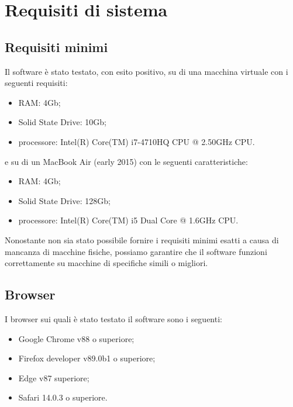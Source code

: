 \chapter{Requisiti di sistema}\label{RequisitiDiSistema}
\section{Requisiti minimi}\label{RequisitiDiSistemaRequisitiMinimi}
Il software è stato testato, con esito positivo, su di una macchina virtuale con i seguenti requisiti:
\begin{itemize}
  \item RAM: 4Gb;
  \item Solid State Drive: 10Gb;
  \item processore: Intel(R) Core(TM) i7-4710HQ CPU @ 2.50GHz CPU.
\end{itemize}
e su di un MacBook Air (early 2015) con le seguenti caratteristiche:
\begin{itemize}
  \item RAM: 4Gb;
  \item Solid State Drive: 128Gb;
  \item processore: Intel(R) Core(TM) i5 Dual Core @ 1.6GHz CPU.
\end{itemize}

Nonostante non sia stato possibile fornire i requisiti minimi esatti a causa di mancanza di macchine fisiche, possiamo garantire che il software funzioni correttamente su macchine di specifiche simili o migliori.

\section{Browser}\label{RequisitiDiSistemaBrowser}
I browser sui quali è stato testato il software sono i seguenti:
\begin{itemize}
  \item Google Chrome v88 o superiore;
  \item Firefox developer v89.0b1 o superiore;
  \item Edge v87 superiore;
  \item Safari 14.0.3 o superiore.
\end{itemize}
